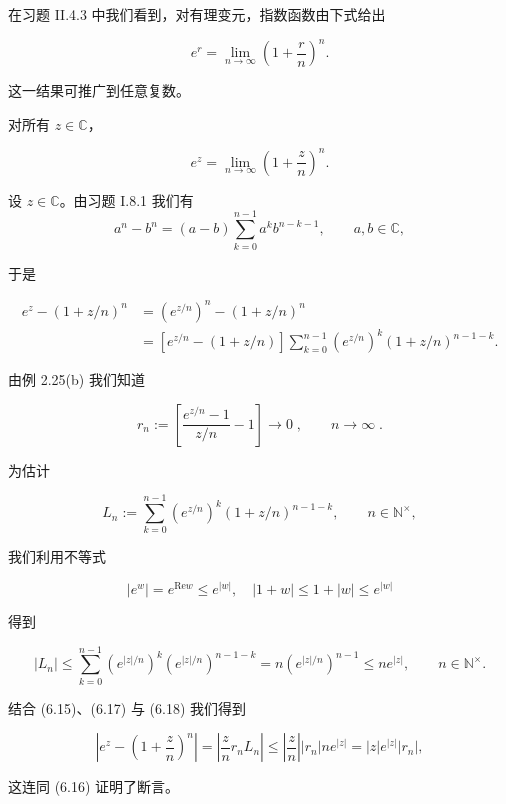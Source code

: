 在习题 II.4.3 中我们看到，对有理变元，指数函数由下式给出

\[
e^{r}=\lim_{n\to\infty}\left(1+\frac{r}{n}\right)^{n}.
\]

这一结果可推广到任意复数。

\begin{theorem}

对所有 $ z \in \mathbb{C} $，

\[
e^{z}=\lim_{n\to\infty}\left(1+\frac{z}{n}\right)^{n}.
\]

\proofhead
设 $ z \in \mathbb{C} $。由习题 I.8.1 我们有
\[
a^{n}-b^{n}=(a-b)\sum_{k=0}^{n-1}a^{k}b^{n-k-1},\qquad a,b\in\mathbb{C},
\]

于是

\begin{equation}
\begin{aligned}
e^{z}-(1+z/n)^{n}&=(e^{z/n})^{n}-(1+z/n)^{n}\\&=\left[e^{z/n}-(1+z/n)\right]\sum_{k=0}^{n-1}(e^{z/n})^{k}(1+z/n)^{n-1-k}.
\end{aligned}
\end{equation}

由例 2.25(b) 我们知道

\begin{equation}
r_{n}:=\left[\frac{e^{z/n}-1}{z/n}-1\right]\to0\;,\qquad n\to\infty\;.
\end{equation}

为估计

\begin{equation}
L_{n}:=\sum_{k=0}^{n-1}(e^{z/n})^{k}(1+z/n)^{n-1-k},\qquad n\in\mathbb{N}^{\times},
\end{equation}

我们利用不等式

\[
|e^{w}|=e^{\mathrm{R e}w}\leq e^{|w|},\quad|1+w|\leq1+|w|\leq e^{|w|}
\]

得到

\begin{equation}
|L_{n}|\leq\sum_{k=0}^{n-1}(e^{|z|/n})^{k}(e^{|z|/n})^{n-1-k}=n(e^{|z|/n})^{n-1}\leq n e^{|z|},\qquad n\in\mathbb{N}^{\times}.
\end{equation}

结合 (6.15)、(6.17) 与 (6.18) 我们得到

\[
\left|e^{z}-\left(1+\frac{z}{n}\right)^{n}\right|=\left|\frac{z}{n}r_{n}L_{n}\right|\leq\left|\frac{z}{n}\right|\left|r_{n}\right|n e^{\left|z\right|}=\left|z\right|e^{\left|z\right|}\left|r_{n}\right|,
\]

这连同 (6.16) 证明了断言。

\end{theorem}

